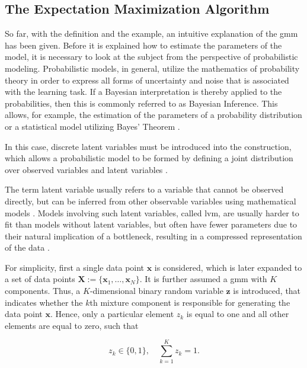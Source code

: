 
\subsection{The Expectation Maximization Algorithm}
So far, with the definition and the example, an intuitive explanation of the \acrshort{gmm} has been given. Before it is explained how to estimate the parameters of the model, it is necessary to look at the subject from the perspective of probabilistic modeling. Probabilistic models, in general, utilize the mathematics of probability theory in order to express all forms of uncertainty and noise that is associated with the learning task. If a Bayesian interpretation is thereby applied to the probabilities, then this is commonly referred to as Bayesian Inference. This allows, for example, the estimation of the parameters of a probability distribution or a statistical model utilizing Bayes' Theorem \cite[p.245]{dei_2020}. 

In this case, discrete latent variables must be introduced into the construction, which allows a probabilistic model to be formed by defining a joint distribution over observed variables and latent variables \cite[432]{bis_2006}. 

The term latent variable usually refers to a variable that cannot be observed directly, but can be inferred from other observable variables using mathematical models \cite{bor_2003}. Models involving such latent variables, called \acrshort{lvm}, are usually harder to fit than models without latent variables, but often have fewer parameters due to their natural implication of a bottleneck, resulting in a compressed representation of the data \cite[337]{mur_2012}. 

For simplicity, first a single data point $\bm{x}$ is considered, which is later expanded to a set of data points $\bm{X}:=\{\bm{x}_1, \dots, \bm{x}_N\}$. It is further assumed a \acrshort{gmm} with $K$ components. Thus, a $K$-dimensional binary random variable $\bm{z}$ is introduced, that indicates whether the $k$th mixture component is responsible for generating the data point $\bm{x}$. Hence, only a particular element $z_k$ is equal to one and all other elements are equal to zero, such that

\begin{equation}
    z_k \in \{0,1\}, \quad \sum\limits^K_{k=1} z_k=1.
\end{equation}

